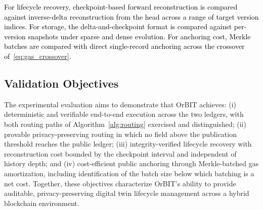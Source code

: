 \documentclass[final,5p,times,twocolumn]{elsarticle}
\begin{document}
\textcolor{black}{For lifecycle recovery, checkpoint-based forward reconstruction is compared against inverse-delta reconstruction from the head across a range of target version indices. For storage, the delta-and-checkpoint format is compared against per-version snapshots under sparse and dense evolution. For anchoring cost, Merkle batches are compared with direct single-record anchoring across the crossover of~\eqref{eq:gas_crossover}.}

\subsection{\textbf{Validation Objectives}}
The experimental evaluation aims to demonstrate that OrBIT achieves: (i) deterministic and verifiable end-to-end execution across the two ledgers, with both routing paths of Algorithm~\ref{alg:routing} exercised and distinguished; (ii) provable privacy-preserving routing in which no field above the publication threshold reaches the public ledger; (iii) integrity-verified lifecycle recovery with reconstruction cost bounded by the checkpoint interval and independent of history depth; and (iv) cost-efficient public anchoring through Merkle-batched gas amortization, including identification of the batch size below which batching is a net cost. Together, these objectives characterize OrBIT's ability to provide auditable, privacy-preserving digital twin lifecycle management across a hybrid blockchain environment.



%
\end{document}

